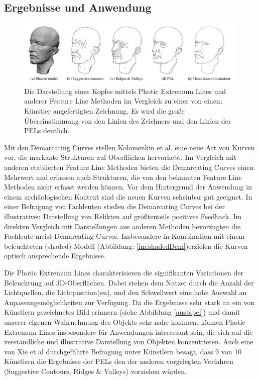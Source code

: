 \documentclass{paperStyle}
\begin{document}
\subsection{Ergebnisse und Anwendung}
\label{ergebnis}
\begin{figure}
	\centering
		\includegraphics[width=0.9\linewidth]{anwpel.png}
	\caption{Die Darstellung eines Kopfes mittels Photic Extremum Lines und anderer Feature Line Methoden im Vergleich zu einer von einem Künstler angefertigten Zeichnung. Es wird die große Übereinstimmung von den Linien des Zeichners und den Linien der PELs deutlich. \cite{Xie2007}}
	\label{anwpel}
\end{figure}
Mit den Demarcating Curves stellen Kolomenkin et al. eine neue Art von Kurven vor, die markante Strukturen auf Oberflächen hervorhebt. Im Vergleich mit anderen etablierten Feature Line Methoden bieten die Demarcating Curves einen Mehrwert und erfassen auch Strukturen, die von den bekannten Feature Line Methoden nicht erfasst werden können. Vor dem Hintergrund der Anwendung in einem archäologischen Kontext sind die neuen Kurven scheinbar gut geeignet. In einer Befragung von Fachleuten stießen die Demarcating Curves bei der illustrativen Darstellung von Relikten auf größtenteils positives Feedback. Im direkten Vergleich mit Darstellungen aus anderen Methoden bevorzugten die Fachleute meist Demarcating Curves. Insbesondere in Kombination mit einem beleuchteten (shaded) Modell (Abbildung: \ref{im:shadedDem})erzielen die Kurven optisch ansprechende Ergebnisse. \cite{Demarcating}

Die Photic Extremum Lines charakterisieren die signifikanten Variationen der Beleuchtung auf 3D-Oberflächen. Dabei stehen dem Nutzer durch die Anzahl der Lichtquellen, die Lichtposition(en), und den Schwellwert eine hohe Auswahl an Anpassungsmöglichkeiten zur Verfügung. Da die Ergebnisse sehr stark an ein von Künstlern gezeichnetes Bild erinnern (siehe Abbildung \ref{ausblpel}) und damit unserer eigenen Wahrnehmung des Objekts sehr nahe kommen, können Photic Extremum Lines insbesondere für Anwendungen interessant sein, die sich auf die verständliche und illustrative Darstellung von Objekten konzentrieren. Auch eine von Xie et al \cite{Xie2007} durchgeführte Befragung unter Künstlern besagt, dass 9 von 10 Künstlern die Ergebnisse der PELs den der anderen vorgelegten Verfahren (Suggestive Contours, Ridges \& Valleys) vorziehen würden. 
\end{document}
